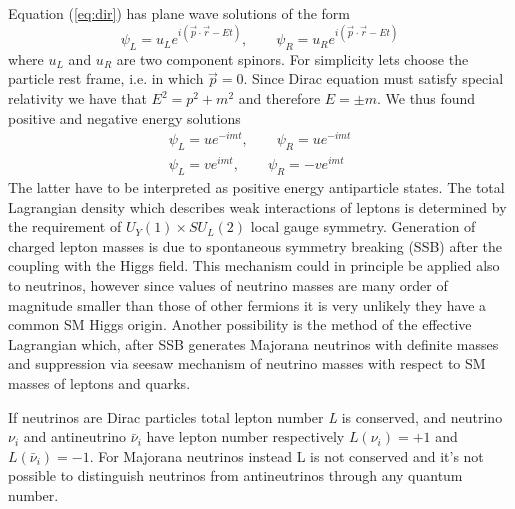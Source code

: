 \documentclass{subnucbo}
\begin{document}
Equation (\ref{eq:dir}) has plane wave solutions of the form
\begin{equation}
\psi_L=u_Le^{i(\vec{p}\cdot\vec{r}-Et)},
\qquad
\psi_R=u_Re^{i(\vec{p}\cdot\vec{r}-Et)}
\end{equation}
where $u_L$ and $u_R$ are two component spinors. For simplicity lets choose the particle rest frame, i.e. in which $\vec{p}=0$. Since Dirac equation must satisfy special relativity we have that $E^2=p^2+m^2$ and therefore $E=\pm m$. We thus found positive and negative energy solutions%
\begin{gather}
\psi_L=ue^{-imt},\qquad  \psi_R=ue^{-imt} \\
\psi_L=ve^{imt},\qquad  \psi_R=-ve^{imt}
\end{gather}
The latter have to be interpreted as positive energy antiparticle states.
The total Lagrangian density which describes weak interactions of leptons is determined by the requirement of $U_Y(1)\times SU_L(2)$ local gauge symmetry.
Generation of charged lepton masses is due to spontaneous symmetry breaking (SSB) after the coupling with the Higgs field.
This mechanism could in principle be applied also to neutrinos, however since values of neutrino masses are many order of magnitude smaller than those of other fermions it is very unlikely they have a common SM Higgs origin.
Another possibility is the method of the effective Lagrangian which, after SSB generates Majorana neutrinos with definite masses and suppression via seesaw mechanism of neutrino masses with respect to SM masses of leptons and quarks.

If neutrinos are Dirac particles total lepton number \emph{L} is conserved, and neutrino $\nu_i$ and antineutrino $\bar{\nu}_i$ have lepton number respectively  $L(\nu_i)=+1$ and $L(\bar{\nu}_i)=-1$.
For Majorana neutrinos instead L is not conserved and it's not possible to distinguish neutrinos from antineutrinos through any quantum number.
\end{document}
